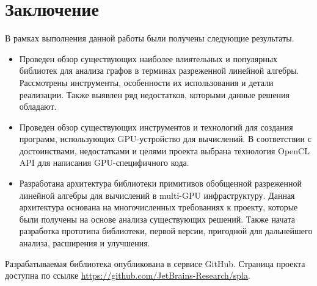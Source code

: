 \section{Заключение}

В рамках выполнения данной работы были получены следующие результаты.

\begin{itemize}
    \item Проведен обзор существующих наиболее влиятельных и популярных библиотек для анализа графов в терминах разреженной линейной алгебры. Рассмотрены инструменты, особенности их использования и детали реализации. Также выявлен ряд недостатков, которыми данные решения обладают.
    
    \item Проведен обзор существующих инструментов и технологий для создания программ, использующих GPU-устройство для вычислений. В соответствии с достоинствами, недостатками и целями проекта выбрана технология OpenCL API для написания GPU-специфичного кода.
    
    \item Разработана архитектура библиотеки примитивов обобщенной разреженной линейной алгебры для вычислений в multi-GPU инфраструктуру. Данная архитектура основана на многочисленных требованиях к проекту, которые были получены на основе анализа существующих решений. Также начата разработка прототипа библиотеки, первой версии, пригодной для дальнейшего анализа, расширения и улучшения.
\end{itemize}

Разрабатываемая библиотека опубликована в сервисе GitHub. Страница проекта доступна по ссылке \url{https://github.com/JetBrains-Research/spla}.
